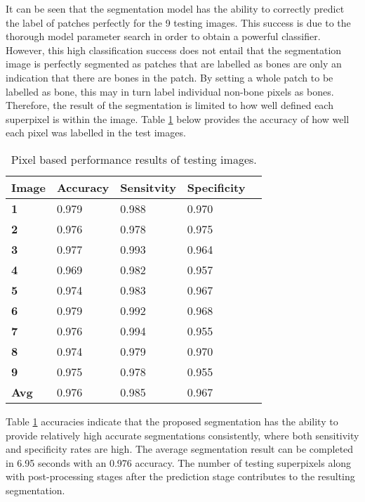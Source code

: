 It can be seen that the segmentation model has the ability to correctly predict the label of patches perfectly for the 9 testing images. This success is due to the thorough model parameter search in order to obtain a powerful classifier. However, this high classification success does not entail that the segmentation image is perfectly segmented as patches that are labelled as bones are only an indication that there are bones in the patch. By setting a whole patch to be labelled as bone, this may in turn label individual non-bone pixels as bones. Therefore, the result of the segmentation is limited to how well defined each superpixel is within the image. Table \ref{table:pixelacc} below provides the accuracy of how well each pixel was labelled in the test images.

\begin{table}[H]
\centering
\caption{Pixel based performance results of testing images.}

\begin{tabular}{|l|l|l|l|l|}
\hline
\textbf{Image}	& \textbf{Accuracy} & \textbf{Sensitvity} & \textbf{Specificity}\\
\hline
\textbf{1}		& 0.979		& 0.988		& 0.970\\ 
\hline
\textbf{2} 		& 0.976		& 0.978		& 0.975\\
\hline
\textbf{3}		& 0.977		& 0.993 		& 0.964\\
\hline
\textbf{4}		& 0.969		& 0.982		& 0.957\\
\hline
\textbf{5}		& 0.974		& 0.983		& 0.967\\
\hline
\textbf{6} 		& 0.979		& 0.992		& 0.968\\
\hline
\textbf{7}		& 0.976		& 0.994		& 0.955\\
\hline
\textbf{8}		& 0.974		& 0.979		& 0.970\\
\hline
\textbf{9} 		& 0.975		& 0.978		& 0.955\\
\hline
\hline
\textbf{Avg}		& 0.976		& 0.985		& 0.967\\		
\hline	    	 			   			    	 
\end{tabular}
\label{table:pixelacc}
\end{table}

Table \ref{table:pixelacc} accuracies indicate that the proposed segmentation has the ability to provide relatively high accurate segmentations consistently, where both sensitivity and specificity rates are high. The average segmentation result can be completed in 6.95 seconds with an 0.976 accuracy. The number of testing superpixels along with post-processing stages after the prediction stage contributes to the resulting segmentation. 

